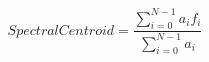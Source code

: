 \begin{equation}
\mathit{SpectralCentroid} = \frac{\displaystyle \sum_{i=0}^{N-1} a_i f_i}{\displaystyle \sum_{i=0}^{N-1} a_i} 
\label{formula_spectral_centroid}
\end{equation}
